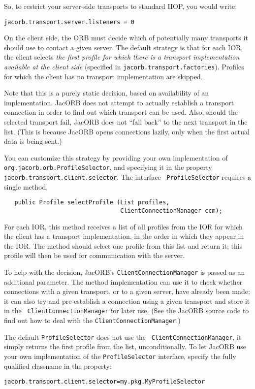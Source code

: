 So, to restrict your server-side transports to standard IIOP, you
would write:

\begin{verbatim}
jacorb.transport.server.listeners = 0
\end{verbatim}

On the client side, the ORB must decide which of potentially many
 transports it should use to contact a given server.  The default
 strategy is that for each IOR, the client selects \emph{the first profile
 for which there is a transport implementation available at the client
 side} (specified in {\tt jacorb.transport.factories}).  Profiles for
which the client has no transport implementation are skipped.

Note that this is a purely static decision, based on availability of
 an implementation.  JacORB does not attempt to actually establish a
 transport connection in order to find out which transport can be
 used.  Also, should the selected transport fail, JacORB does not
 ``fall back'' to the next transport in the list.  (This is because
 JacORB opens connections lazily, only when the first actual data is
 being sent.)

You can customize this strategy by providing your own implementation of
{\tt org.jacorb.orb.ProfileSelector}, and specifying it in the
property {\tt jacorb.transport.client.selector}.  The interface {\tt
ProfileSelector} requires a single method,

\begin{verbatim}
   public Profile selectProfile (List profiles,
                                 ClientConnectionManager ccm);
\end{verbatim}

For each IOR, this method receives a list of all profiles from the IOR
 for which the client has a transport implementation, in the order in
 which they appear in the IOR.  The method should select one profile
 from this list and return it; this profile will then be used for
 communication with the server.

To help with the decision, JacORB's {\tt ClientConnectionManager} is
 passed as an additional parameter.  The method implementation can use
 it to check whether connections with a given transport, or to a given
 server, have already been made; it can also try and pre-establish a
 connection using a given transport and store it in the {\tt
 ClientConnectionManager} for later use.  (See the JacORB source code
to find out how to deal with the {\tt ClientConnectionManager}.)

The default {\tt ProfileSelector} does not use the {\tt
 ClientConnectionManager}, it simply returns the first profile from
 the list, unconditionally.  To let JacORB use your own implementation
 of the {\tt ProfileSelector} interface, specify the fully qualified
 classname in the property:

\begin{verbatim}
jacorb.transport.client.selector=my.pkg.MyProfileSelector
\end{verbatim}


